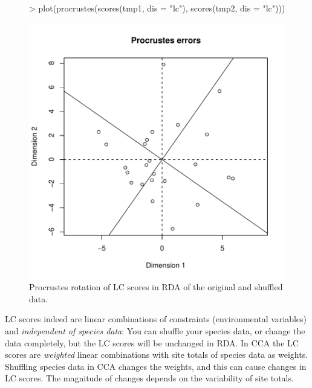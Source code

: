\documentclass[a4paper]{article}
\begin{document}
\begin{figure}
\begin{center}
\begin{Schunk}
\begin{Sinput}
> plot(procrustes(scores(tmp1, dis = "lc"), scores(tmp2, dis = "lc")))
\end{Sinput}
\end{Schunk}
\includegraphics{vegan-FAQ-007}
\caption{Procrustes rotation of LC scores in RDA of the original and shuffled data.}
\label{fig:rdaproc}
\end{center}
\end{figure}

LC scores indeed are linear combinations of constraints (environmental
variables) and \emph{independent of species data}: You can
shuffle your species data, or change the data completely, but the LC
scores will be unchanged in RDA.  In CCA the LC scores are
\emph{weighted} linear combinations with site totals of species data
as weights. Shuffling species data in CCA changes the weights, and
this can cause changes in LC scores.  The magnitude of changes depends
on the variability of site totals. 
\end{document}
